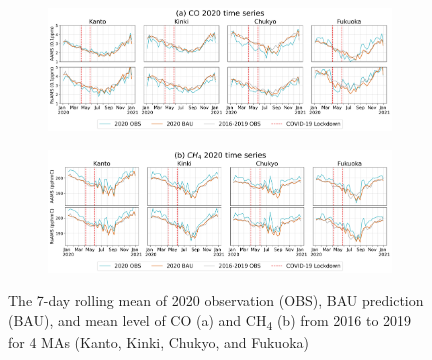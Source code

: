 \begin{figure}[tbh!]
    \centering
    \begin{subfigure}{\textwidth}
      \centering
      \includegraphics[width=\textwidth]{figs/chap4/fig8a.png}
      \label{fig:chap4_fig8a}
    \end{subfigure}

    \begin{subfigure}{\textwidth}
      \centering
      \includegraphics[width=\textwidth]{figs/chap4/fig8b.png}
      \label{fig:chap4_fig8b}
    \end{subfigure}
    \caption[2020 CO and CH\textsubscript{4} mean trends (4 MAs)]{The 7-day rolling mean of 2020 observation (OBS), BAU prediction (BAU), and mean level of CO (a) and CH\textsubscript{4} (b) from 2016 to 2019 for 4 MAs (Kanto, Kinki, Chukyo, and Fukuoka)}
    \label{fig:chap4_fig8}
\end{figure}

